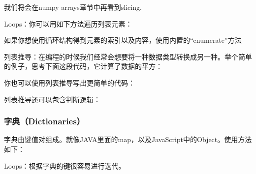 \documentclass[10pt,a4paper]{article}
\begin{document}



我们将会在numpy arrays章节中再看到slicing.



Loops：你可以用如下方法遍历列表元素：




如果你想使用循环结构得到元素的索引以及内容，使用内置的“enumerate”方法





列表推导：在编程的时候我们经常会想要将一种数据类型转换成另一种。举个简单的例子，思考下面这段代码，它计算了数据的平方：





你也可以使用列表推导写出更简单的代码：




列表推导还可以包含判断逻辑：




\subsubsection{字典（Dictionaries）}


字典由键值对组成。就像JAVA里面的map，以及JavaScript中的Object。使用方法如下：





Loops：根据字典的键很容易进行迭代。

\end{document}

